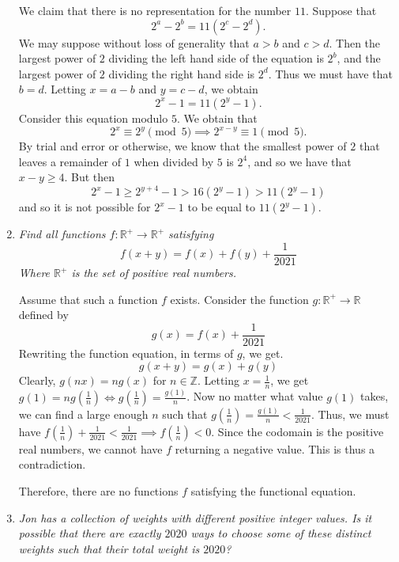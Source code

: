 \documentclass{article}
\begin{document}
\begin{enumerate}[1.]
We claim that there is no representation for the number $11$. Suppose that
\[
  2^a - 2^b = 11(2^c - 2^d).
\]
We may suppose without loss of generality that $a > b$ and $c > d$. Then the largest power of $2$ dividing the left hand side of the equation is $2^b$, and the largest power of $2$ dividing the right hand side is $2^d$. Thus we must have that $b = d$. Letting $x = a - b$ and $y = c - d$, we obtain
\[
  2^x - 1 = 11(2^y - 1).
\]
Consider this equation modulo $5$. We obtain that
\[
  2^x \equiv 2^y \pmod 5 \implies 2^{x - y} \equiv 1 \pmod 5.
\]
By trial and error or otherwise, we know that the smallest power of $2$ that leaves a remainder of $1$ when divided by $5$ is $2^4$, and so we have that $x - y \geq 4$. But then
\[
  2^x - 1 \geq 2^{y + 4} - 1 > 16(2^y - 1) > 11(2^y - 1)
\]
and so it is not possible for $2^x - 1$ to be equal to $11(2^y - 1)$.


\item %
{\itshape Find all functions $f: \mathbb{R}^+ \rightarrow \mathbb{R}^+$ satisfying 
$$f(x + y) = f(x) + f(y) + \frac{1}{2021} $$
Where $\mathbb{R}^+$ is the set of positive real numbers. }

Assume that such a function $f$ exists. Consider the function $g: \mathbb{R}^+ \rightarrow \mathbb{R}$ defined by 
$$g(x) = f(x) + \frac{1}{2021}$$
Rewriting the function equation, in terms of $g$, we get. 
$$g(x + y) = g(x) + g(y)$$
Clearly, $g(nx) = ng(x)$ for $n \in \mathbb{Z}$. Letting $x = \frac{1}{n}$, we get $g(1) = ng(\frac{1}{n}) \iff g(\frac{1}{n}) = \frac{g(1)}{n}$. Now no matter what value $g(1)$ takes, we can find a large enough $n$ such that $g(\frac{1}{n}) = \frac{g(1)}{n} < \frac{1}{2021}$. Thus, we must have $f(\frac{1}{n}) + \frac{1}{2021} < \frac{1}{2021} \implies f(\frac{1}{n}) < 0$. Since the codomain is the positive real numbers, we cannot have $f$ returning a negative value. This is thus a contradiction.

Therefore, there are no functions $f$ satisfying the functional equation.


\item %
{\itshape Jon has a collection of weights with different positive integer values. Is it possible that there are exactly $2020$ ways to choose some of these distinct weights such that their total weight is $2020$?}


\end{enumerate}
\end{document}

